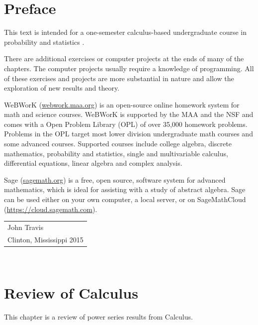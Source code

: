 \documentclass[10pt,]{book}
\theoremstyle{plain}
\theoremstyle{definition}
\theoremstyle{definition}
\numberwithin{equation}{section}
\begin{document}
\chapter*{Preface}\label{preface-1}
This text is intended for a one-semester calculus-based undergraduate course in probability and statistics .%
\par
There are additional exercises or computer projects at the ends of many of the chapters. The computer projects usually require a knowledge of programming. All of these exercises and projects are more substantial in nature and allow the exploration of new results and theory.%
\par
WeBWorK (\href{http://webwork.maa.org}{webwork.maa.org}) is an open-source online homework system for math and science courses. WeBWorK is supported by the MAA and the NSF and comes with a Open Problem Library (OPL) of over 35,000 homework problems. Problems in the OPL target most lower division undergraduate math courses and some advanced courses. Supported courses include college algebra, discrete mathematics, probability and statistics, single and multivariable calculus, differential equations, linear algebra and complex analysis.%
\par
Sage (\href{http://sagemath.org}{sagemath.org}) is a free, open source, software system for advanced mathematics, which is ideal for assisting with a study of abstract algebra. Sage can be used either on your own computer, a local server, or on SageMathCloud (\href{https://cloud.sagemath.com}{https://cloud.sagemath.com}). %
\par\hfill\begin{tabular}{l@{}}
John Travis\\
Clinton, Mississippi  2015
\end{tabular}\\\par
\setcounter{tocdepth}{1}
\renewcommand*\contentsname{Contents}
\tableofcontents
\mainmatter
\typeout{************************************************}
\typeout{************************************************}
\chapter[Review of Calculus]{Review of Calculus}\label{PowerSeriesReview}
\typeout{************************************************}
\typeout{************************************************}
This chapter is a review of power series results from Calculus.%
\typeout{************************************************}
\typeout{************************************************}
\end{document}
